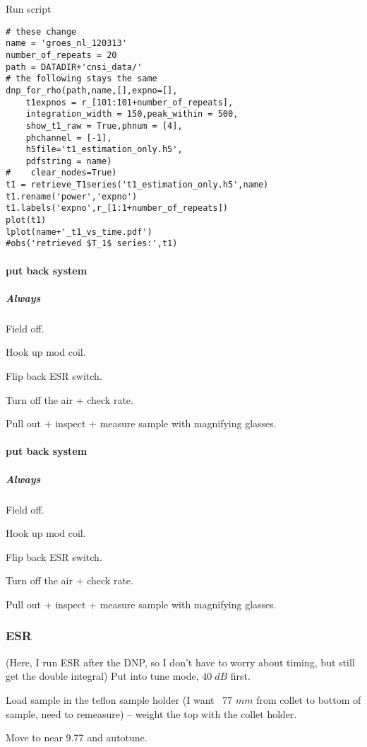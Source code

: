 Run script

\begin{scriptsize}
\begin{lstlisting}
# these change
name = 'groes_nl_120313'
number_of_repeats = 20
path = DATADIR+'cnsi_data/'
# the following stays the same
dnp_for_rho(path,name,[],expno=[],
    t1expnos = r_[101:101+number_of_repeats],
    integration_width = 150,peak_within = 500,
    show_t1_raw = True,phnum = [4],
    phchannel = [-1],
    h5file='t1_estimation_only.h5',
    pdfstring = name)
#    clear_nodes=True)
t1 = retrieve_T1series('t1_estimation_only.h5',name)
t1.rename('power','expno')
t1.labels('expno',r_[1:1+number_of_repeats])
plot(t1)
lplot(name+'_t1_vs_time.pdf')
#obs('retrieved $T_1$ series:',t1)
\end{lstlisting}
\end{scriptsize}
\paragraph{put back system}
\subparagraph{Always}
Field off.

Hook up mod coil.

Flip back ESR switch.

Turn off the air + check rate.

Pull out + inspect + measure sample with magnifying glasses.

\paragraph{put back system}
\subparagraph{Always}
Field off.

Hook up mod coil.

Flip back ESR switch.

Turn off the air + check rate.

Pull out + inspect + measure sample with magnifying glasses.

\subsubsection{ESR}

(Here, I run ESR after the DNP, so I don't have to worry about timing, but still get the double integral)
Put into tune mode, $40\;dB$ first.

Load sample in the teflon sample holder (I want ~77 $mm$ from collet to bottom of sample, need to remeasure) -- weight the top with the collet holder.

Move to near 9.77 and autotune.

